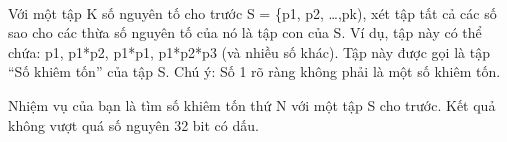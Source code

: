  

Với một tập K số nguyên tố cho trước S = \{p1, p2, …,pk), xét tập tất cả các số sao cho các thừa số nguyên tố của nó là tập con của S. Ví dụ, tập này có thể chứa: p1, p1*p2, p1*p1, p1*p2*p3 (và nhiều số khác). Tập này được gọi là tập “Số khiêm tốn” của tập S. Chú ý: Số 1 rõ ràng không phải là một số khiêm tốn.

Nhiệm vụ của bạn là tìm số khiêm tốn thứ N với một tập S cho trước. Kết quả không vượt quá số nguyên 32 bit có dấu.

\